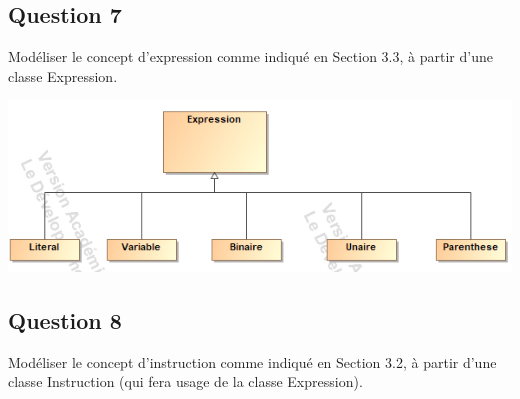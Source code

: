 \documentclass[11pt]{article}
\begin{document}
\subsection{Question 7}

Modéliser le concept d'expression comme indiqué en Section 3.3, à partir d'une classe Expression.

 \includegraphics[scale=0.5]{Play_Expression.png}

\subsection{Question 8}

Modéliser le concept d'instruction comme indiqué en Section 3.2, à partir d'une classe Instruction (qui fera usage de la classe Expression).
\end{document}
